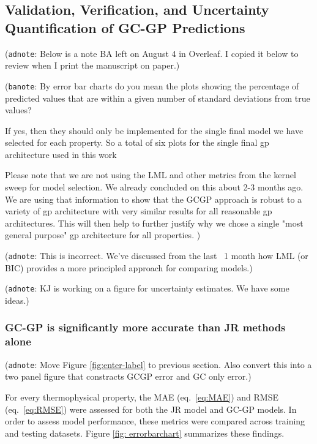 \documentclass[journal=jacsat,manuscript=article]{achemso}
\newcommand{\adnote}[1]{{\color{OliveGreen} (\texttt{adnote}: #1)}}
\newcommand{\banote}[1]{{\color{Salmon} (\texttt{banote}: #1)}}
\begin{document}
\subsection{Validation, Verification, and Uncertainty Quantification of GC-GP Predictions}
\adnote{Below is a note BA left on August 4 in Overleaf. I copied it below to review when I print the manuscript on paper.}

\banote{By error bar charts do you mean the plots showing the percentage of predicted values that are within a given number of standard deviations from true values?

If yes, then they should only be implemented for the single final model we have selected for each property. So a total of six plots for  the single final gp architecture used in this work

Please note that we are not using the LML and other metrics from the kernel sweep for model selection. We already concluded on this about 2-3 months ago. 
We are using that information to show that the GCGP approach is robust to a variety of gp architecture with very similar results for all reasonable gp architectures. This will then help to further justify why we chose a single "most general purpose" gp architecture for all properties. }

\adnote{This is incorrect. We've discussed from the last ~1 month how LML (or BIC) provides a more principled approach for comparing models.}

\adnote{KJ is working on a figure for uncertainty estimates. We have some ideas.}

\subsubsection{GC-GP is significantly more accurate than JR methods alone}

\adnote{Move Figure \ref{fig:enter-label} to previous section. Also convert this into a two panel figure that constracts GCGP error and GC only error.}

For every thermophysical property, the MAE (eq.~\eqref{eq:MAE}) and RMSE (eq.~\eqref{eq:RMSE}) were assessed for both the JR model and GC-GP models. In order to assess model performance, these metrics were compared across training and testing datasets. Figure \ref{fig: errorbarchart} summarizes these findings.
\end{document}
